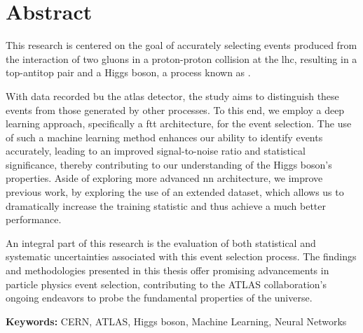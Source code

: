 \chapter*{Abstract}

This research is centered on the goal of accurately selecting events produced from the interaction of two gluons in a
proton-proton collision at the \acrshort{lhc}, resulting in a top-antitop pair and a Higgs boson, a process known as \tth.

With data recorded bu the \acrshort{atlas} detector, the study aims to distinguish these \tth events
from those generated by other processes. To this end, we employ a deep learning approach, specifically a \acrshort{ftt}
architecture, for the event selection. The use of such a machine learning method enhances our ability to identify \tth
events accurately, leading to an improved signal-to-noise ratio and statistical significance, thereby contributing to
our understanding of the Higgs boson's properties. Aside of exploring more advanced \acrshort{nn} architecture, we
improve previous work, by exploring the use of an extended dataset, which allows us to dramatically increase the
training statistic and thus achieve a much better performance.

An integral part of this research is the evaluation of both statistical and systematic uncertainties associated with
this event selection process. The findings and methodologies presented in this thesis offer promising advancements in
particle physics event selection, contributing to the ATLAS collaboration's ongoing endeavors to probe the fundamental
properties of the universe.

\vspace{3mm}
\noindent
\textbf{Keywords:}
CERN, ATLAS, Higgs boson, Machine Learning, Neural Networks